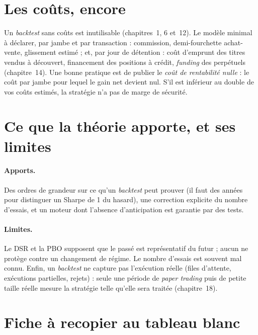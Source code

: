 \section{Les coûts, encore}

Un \emph{backtest} sans coûts est inutilisable (chapitres~1, 6 et~12). Le modèle minimal à déclarer, par jambe et par transaction : commission, demi-fourchette achat-vente, glissement estimé ; et, par jour de détention : coût d'emprunt des titres vendus à découvert, financement des positions à crédit, \emph{funding} des perpétuels (chapitre~14). Une bonne pratique est de publier le \emph{coût de rentabilité nulle} : le coût par jambe pour lequel le gain net devient nul. S'il est inférieur au double de vos coûts estimés, la stratégie n'a pas de marge de sécurité.

\section{Ce que la théorie apporte, et ses limites}

\paragraph{Apports.} Des ordres de grandeur sur ce qu'un \emph{backtest} peut prouver (il faut des années pour distinguer un Sharpe de 1 du hasard), une correction explicite du nombre d'essais, et un moteur dont l'absence d'anticipation est garantie par des tests.

\paragraph{Limites.} Le DSR et la PBO supposent que le passé est représentatif du futur ; aucun ne protège contre un changement de régime. Le nombre d'essais est souvent mal connu. Enfin, un \emph{backtest} ne capture pas l'exécution réelle (files d'attente, exécutions partielles, rejets) : seule une période de \emph{paper trading} puis de petite taille réelle mesure la stratégie telle qu'elle sera traitée (chapitre~18).

\section{Fiche à recopier au tableau blanc}

